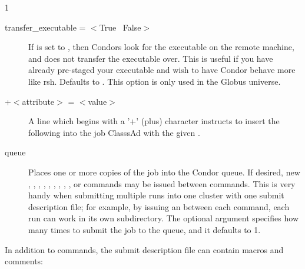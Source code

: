 \begin{ManPage}{\label{man-condor-submit}}{1}
\begin{description}

\item[transfer\_executable = $<$True \Bar\ False$>$] If  is set to
, then Condors look for the executable on the remote machine, and
does not transfer the executable over.
This is useful if you have already pre-staged your
executable and wish to have Condor behave more like rsh.
Defaults to .
This option is only used in the Globus universe.


\item[+$<$attribute$>$ = $<$value$>$] A line which begins with a '+'
(plus) character instructs  to insert the
following  into the job ClasssAd with the given 
. 


\item[queue ] Places one or more
copies of the job into
the Condor queue. If desired, new , ,
, , , ,
, , , or 
commands may be issued between  commands. This is very handy
when submitting multiple runs into one cluster with one submit description
file;
for example, by issuing an  between each 
command, each run can work in its own subdirectory.
The optional
argument  specifies how many times to submit the
job to the queue, and it defaults to 1.


\end{description}

In addition to commands, the submit description file can contain macros
and comments:

\begin{description}


\end{description}
\end{ManPage}
